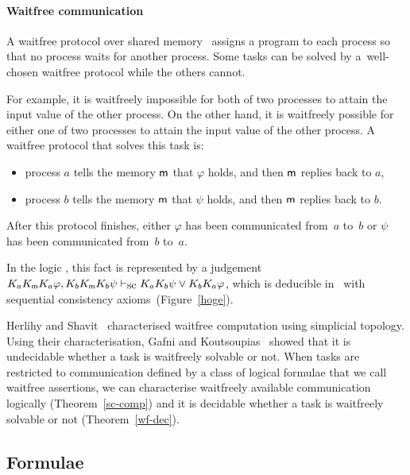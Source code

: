     \paragraph{Waitfree communication}
    A waitfree protocol over shared memory~\cite{herlihy1991wait}
    assigns a program to each process so that no process waits for another process.
    Some tasks can be solved by a~well-chosen waitfree protocol while the others cannot.

    For example,
    it is waitfreely impossible for both of two processes to attain the input value of the other
    process.
    On the other hand, it is waitfreely possible for
    either one of two processes to attain the input value of the other process.
    A waitfree protocol that solves this task is:
    \begin{itemize}
     \item process $a$ tells the memory ${\sf m}$ that $\varphi$ holds, and then ${\sf m}$ replies back to $a$,
     \item process $b$ tells the memory ${\sf m}$ that $\psi$    holds, and then ${\sf m}$ replies back to $b$.
    \end{itemize}
    After this protocol finishes,
    either $\varphi$ has been communicated from~$a$ to~$b$
    or $\psi$ has
    been communicated from~$b$ to~$a$.

    In the
    logic \iec, this fact is represented by a judgement $K_aK_{\sf m}{}K_a\varphi,
    K_bK_{\sf m}{}K_b\psi\vdash_{\mbox{\rm sc}} K_aK_b\psi\vee K_bK_a\varphi$,
    which is deducible in \iec\, with
    sequential consistency axioms~(Figure~\ref{hoge}).

    Herlihy and Shavit~\cite{herlihy1999topological} characterised waitfree computation using
    simplicial topology.
    Using their characterisation,
    Gafni and Koutsoupias~\cite{gafni1999three}
    showed that it is undecidable whether a task is waitfreely solvable
    or not.
    When tasks are restricted to communication defined by
    a class of logical formulae that we call waitfree assertions,
    we can characterise waitfreely available communication logically (Theorem~\ref{sc-comp})
    and
    it is decidable whether a task is waitfreely solvable or not (Theorem~\ref{wf-dec}).



  \subsection{Formulae}

